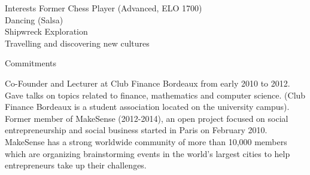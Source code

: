 \documentclass{resume} %
\begin{document}
\begin{rSection}{Interests}
Former Chess Player (Advanced, ELO 1700) \\ 
Dancing (Salsa) \\
Shipwreck Exploration \\
Travelling and discovering new cultures
\end{rSection}

\begin{rSection}{Commitments}

Co-Founder and Lecturer at Club Finance Bordeaux from early 2010 to 2012. Gave talks on topics related to finance, mathematics and computer science. (Club Finance Bordeaux is a student association located on the university campus). \\

Former  member  of MakeSense  (2012-2014),  an  open  project  focused  on  social  entrepreneurship and  social  business started in Paris on February 2010. MakeSense has a strong worldwide community of more than 10,000 members which are organizing brainstorming events in the world’s largest cities to help entrepreneurs take up their challenges.

\end{rSection}





\end{document}
